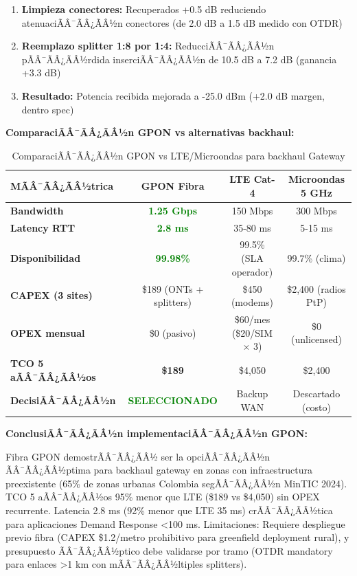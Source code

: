 \begin{enumerate}
    \item \textbf{Limpieza conectores:} Recuperados +0.5 dB reduciendo atenuaciÃÂ¯ÃÂ¿ÃÂ½n conectores (de 2.0 dB a 1.5 dB medido con OTDR)
    \item \textbf{Reemplazo splitter 1:8 por 1:4:} ReducciÃÂ¯ÃÂ¿ÃÂ½n pÃÂ¯ÃÂ¿ÃÂ½rdida inserciÃÂ¯ÃÂ¿ÃÂ½n de 10.5 dB a 7.2 dB (ganancia +3.3 dB)
    \item \textbf{Resultado:} Potencia recibida mejorada a -25.0 dBm (+2.0 dB margen, dentro spec)
\end{enumerate}

\textbf{ComparaciÃÂ¯ÃÂ¿ÃÂ½n GPON vs alternativas backhaul:}

\begin{table}[H]
\centering
\caption{ComparaciÃÂ¯ÃÂ¿ÃÂ½n GPON vs LTE/Microondas para backhaul Gateway}
\label{tab:impl-gpon-comparison}
\small
\begin{tabular}{|l|c|c|c|}
\hline
\rowcolor{gray!20}
\textbf{MÃÂ¯ÃÂ¿ÃÂ½trica} & \textbf{GPON Fibra} & \textbf{LTE Cat-4} & \textbf{Microondas 5 GHz} \\
\hline
\textbf{Bandwidth} & \textcolor{green}{\textbf{1.25 Gbps}} & 150 Mbps & 300 Mbps \\
\hline
\textbf{Latency RTT} & \textcolor{green}{\textbf{2.8 ms}} & 35-80 ms & 5-15 ms \\
\hline
\textbf{Disponibilidad} & \textcolor{green}{\textbf{99.98\%}} & 99.5\% (SLA operador) & 99.7\% (clima) \\
\hline
\textbf{CAPEX (3 sites)} & \$189 (ONTs + splitters) & \$450 (modems) & \$2,400 (radios PtP) \\
\hline
\textbf{OPEX mensual} & \$0 (pasivo) & \$60/mes (\$20/SIM $\times$ 3) & \$0 (unlicensed) \\
\hline
\textbf{TCO 5 aÃÂ¯ÃÂ¿ÃÂ½os} & \textbf{\$189} & \$4,050 & \$2,400 \\
\hline
\textbf{DecisiÃÂ¯ÃÂ¿ÃÂ½n} & \textcolor{green}{\textbf{SELECCIONADO}} & Backup WAN & Descartado (costo) \\
\hline
\end{tabular}
\end{table}

\textbf{ConclusiÃÂ¯ÃÂ¿ÃÂ½n implementaciÃÂ¯ÃÂ¿ÃÂ½n GPON:}

Fibra GPON demostrÃÂ¯ÃÂ¿ÃÂ½ ser la opciÃÂ¯ÃÂ¿ÃÂ½n ÃÂ¯ÃÂ¿ÃÂ½ptima para backhaul gateway en zonas con infraestructura preexistente (65\% de zonas urbanas Colombia segÃÂ¯ÃÂ¿ÃÂ½n MinTIC 2024). TCO 5 aÃÂ¯ÃÂ¿ÃÂ½os 95\% menor que LTE (\$189 vs \$4,050) sin OPEX recurrente. Latencia 2.8 ms (92\% menor que LTE 35 ms) crÃÂ¯ÃÂ¿ÃÂ½tica para aplicaciones Demand Response <100 ms. Limitaciones: Requiere despliegue previo fibra (CAPEX \$1.2/metro prohibitivo para greenfield deployment rural), y presupuesto ÃÂ¯ÃÂ¿ÃÂ½ptico debe validarse por tramo (OTDR mandatory para enlaces >1 km con mÃÂ¯ÃÂ¿ÃÂ½ltiples splitters).

